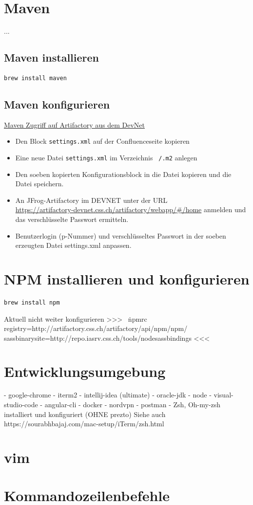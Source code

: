 \documentclass[]{article}
\newcommand{\code}[1]{\texttt{#1}}
\begin{document}
\section{Maven}
...
\subsection{Maven installieren}
\begin{verbatim}
brew install maven
\end{verbatim}

\subsection{Maven konfigurieren}
\href{https://confluence.css.ch/confluence/display/TEA/Maven+Zugriff+auf+Artifactory+aus+dem+DevNet}{Maven Zugriff auf Artifactory aus dem DevNet}
\begin{itemize}
	\item Den Block \code{settings.xml} auf der Confluenceseite kopieren
	\item Eine neue Datei \code{settings.xml} im Verzeichnis \code{~/.m2} anlegen
	\item Den soeben kopierten Konfigurationsblock in die Datei kopieren und die Datei speichern.
	\item An JFrog-Artifactory im DEVNET unter der URL \\
	\url{https://artifactory-devnet.css.ch/artifactory/webapp/#/home}
	anmelden und das verschlüsselte Passwort ermitteln.
	\item Benutzerlogin (p-Nummer) und verschlüsseltes Passwort in der soeben erzeugten Datei settings.xml anpassen.
\end{itemize}




\section{NPM installieren und konfigurieren}
\begin{verbatim}
brew install npm
\end{verbatim}

Aktuell nicht weiter konfigurieren >>>
~\.npmrc
registry=http://artifactory.css.ch/artifactory/api/npm/npm/
sass\textunderscore binary\textunderscore site=http://repo.iasrv.css.ch/tools/node\textunderscore sass\textunderscore bindings
<<<

\section{Entwicklungsumgebung}
    - google-chrome
- iterm2
- intellij-idea (ultimate)
- oracle-jdk
- node
- visual-studio-code
- angular-cli
- docker
- nordvpn
- postman
- Zsh, Oh-my-zsh installiert und konfiguriert (OHNE prezto)
Siehe auch https://sourabhbajaj.com/mac-setup/iTerm/zsh.html

\section{vim}
\section{Kommandozeilenbefehle}

\printbibliography
\end{document}
